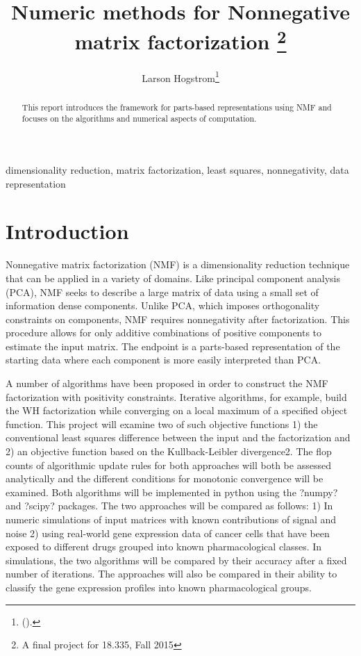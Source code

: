 \documentclass[final,leqno,onefignum,onetabnum]{siamltex1213}
\title{Numeric methods for Nonnegative matrix factorization \thanks{A final project for 18.335, Fall 2015}}
\author{Larson Hogstrom\thanks{
(\email{hogstrom@mit.edu}). }}
\begin{document}
\maketitle
{}%

\begin{abstract}
This report introduces the framework for parts-based representations using NMF and focuses on the algorithms and numerical aspects of computation. 

\end{abstract}

\begin{keywords} dimensionality reduction, matrix factorization, least squares, nonnegativity, data representation \end{keywords}



\pagestyle{myheadings}
\thispagestyle{plain}

\section{Introduction}

Nonnegative matrix factorization (NMF) is a dimensionality reduction technique that can be applied in a variety of domains. Like principal component analysis (PCA), NMF seeks to describe a large matrix of data using a small set of information dense components. Unlike PCA, which imposes orthogonality constraints on components, NMF requires nonnegativity after factorization. This procedure allows for only additive combinations of positive components to estimate the input matrix. The endpoint is a parts-based representation of the starting data where each component is more easily interpreted than PCA. 


A number of algorithms have been proposed in order to construct the NMF factorization with positivity constraints. Iterative algorithms, for example, build the WH factorization while converging on a local maximum of a specified object function. This project will examine two of such objective functions 1) the conventional least squares difference between the input and the factorization and 2) an objective function based on the Kullback-Leibler divergence2. The flop counts of algorithmic update rules for both approaches will both be assessed analytically and the different conditions for monotonic convergence will be examined. Both algorithms will be implemented in python using the ?numpy? and ?scipy? packages. The two approaches will be compared as follows: 1) In numeric simulations of input matrices with known contributions of signal and noise 2) using real-world gene expression data of cancer cells that have been exposed to different drugs grouped into known pharmacological classes. In simulations, the two algorithms will be compared by their accuracy after a fixed number of iterations. The approaches will also be compared in their ability to classify the gene expression profiles into known pharmacological groups.
\end{document}
